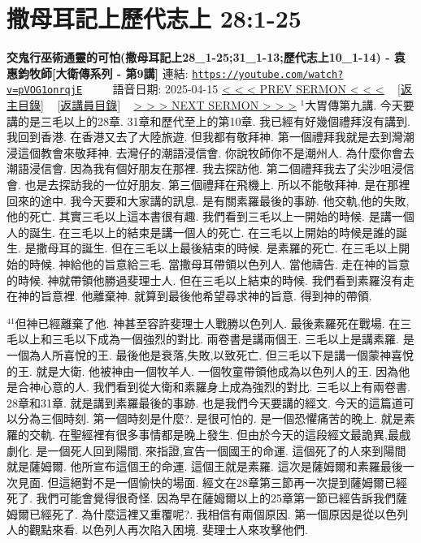 \documentclass{book}
\begin{document}
\section{撒母耳記上歷代志上 28:1-25}
\label{sec:pVOG1onrqjE}
\textbf{交鬼行巫術通靈的可怕(撒母耳記上28\_1-25;31\_1-13;歷代志上10\_1-14) - 袁惠鈞牧師[大衛傳系列 - 第9講]}
\newline
\newline
連結: \href{https://youtube.com/watch?v=pVOG1onrqjE}{\texttt{https://youtube.com/watch?v=pVOG1onrqjE}} ~~~~ 語音日期: 2025-04-15
\newline
\newline
\hyperref[sec:w_ajWsBZ9eQ]{< < < PREV SERMON < < <}
~
\hyperlink{toc}{[返主目錄]}
~
\hyperref[ch:preacher12]{[返講員目錄]}
~
\hyperref[sec:yRzXvTTOZfM]{> > > NEXT SERMON > > >}
\newline
\newline
$^{1}$大胃傳第九講.
今天要講的是三毛以上的28章.
31章和歷代至上的第10章.
我已經有好幾個禮拜沒有講到.
我回到香港.
在香港又去了大陸旅遊.
但我都有敬拜神.
第一個禮拜我就是去到灣潮浸這個教會來敬拜神.
去灣仔的潮語浸信會.
你說牧師你不是潮州人.
為什麼你會去潮語浸信會.
因為我有個好朋友在那裡.
我去探訪他.
第二個禮拜我去了尖沙咀浸信會.
也是去探訪我的一位好朋友.
第三個禮拜在飛機上.
所以不能敬拜神.
是在那裡回來的途中.
我今天要和大家講的訊息.
是有關素羅最後的事跡.
他交軌,他的失敗,他的死亡.
其實三毛以上這本書很有趣.
我們看到三毛以上一開始的時候.
是講一個人的誕生.
在三毛以上的結束是講一個人的死亡.
在三毛以上開始的時候是誰的誕生.
是撒母耳的誕生.
但在三毛以上最後結束的時候.
是素羅的死亡.
在三毛以上開始的時候.
神給他的旨意給三毛.
當撒母耳帶領以色列人.
當他禱告.
走在神的旨意的時候.
神就帶領他勝過斐理士人.
但在三毛以上結束的時候.
我們看到素羅沒有走在神的旨意裡.
他離棄神.
就算到最後他希望尋求神的旨意.
得到神的帶領.

$^{41}$但神已經離棄了他.
神甚至容許斐理士人戰勝以色列人.
最後素羅死在戰場.
在三毛以上和三毛以下成為一個強烈的對比.
兩卷書是講兩個王.
三毛以上是講素羅.
是一個為人所喜悅的王.
最後他是衰落,失敗,以致死亡.
但三毛以下是講一個蒙神喜悅的王.
就是大衛.
他被神由一個牧羊人.
一個牧童帶領他成為以色列人的王.
因為他是合神心意的人.
我們看到從大衛和素羅身上成為強烈的對比.
三毛以上有兩卷書.
28章和31章.
就是講到素羅最後的事跡.
也是我們今天要講的經文.
今天的這篇道可以分為三個時刻.
第一個時刻是什麼?.
是很可怕的.
是一個恐懼痛苦的晚上.
就是素羅的交軌.
在聖經裡有很多事情都是晚上發生.
但由於今天的這段經文最詭異,最戲劇化.
是一個死人回到陽間.
來指證,宣告一個國王的命運.
這個死了的人來到陽間就是薩姆爾.
他所宣布這個王的命運.
這個王就是素羅.
這次是薩姆爾和素羅最後一次見面.
但這絕對不是一個愉快的場面.
經文在28章第三節再一次提到薩姆爾已經死了.
我們可能會覺得很奇怪.
因為早在薩姆爾以上的25章第一節已經告訴我們薩姆爾已經死了.
為什麼這裡又重覆呢?.
我相信有兩個原因.
第一個原因是從以色列人的觀點來看.
以色列人再次陷入困境.
斐理士人來攻擊他們.
\end{document}
